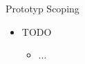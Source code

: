 \begin{Slide}{Prototyp Scoping}
\begin{itemize}
\item TODO
\begin{itemize}
\item ...

\end{itemize}
\end{itemize}
\end{Slide}